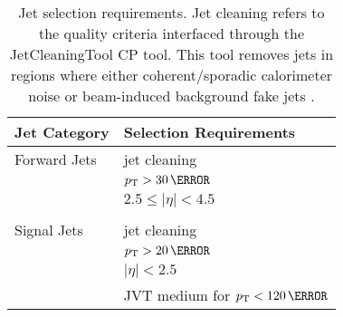 \begin{table}
  \centering
  \begin{tabular}{l l}
    \toprule
   Jet Category & Selection Requirements \\
    \midrule
    Forward Jets & jet cleaning \\
    & $p_{\mathrm{T}} > 30\,\mathrm{\GeV}$ \\
    & $2.5 \leq \left|\eta\right| < 4.5$ \\ 
    &\\
    Signal Jets & jet cleaning \\
    & $p_{\mathrm{T}} > 20\,\mathrm{\GeV}$ \\
    & $ \left|\eta\right| < 2.5$ \\ 
    & JVT medium for $p_{\mathrm{T}} < 120\,\mathrm{\GeV}$ \\
    \bottomrule
  \end{tabular}
  \caption[Jet selection requirements.]{Jet selection requirements. Jet cleaning
    refers to the quality criteria interfaced through the JetCleaningTool CP
    tool. This tool removes jets in regions where either coherent/sporadic
    calorimeter noise or beam-induced background fake jets
    \cite{ATLAS-CONF-2015-029,Gonski:2272136}.}
  \label{tab:jet-cats}
\end{table}